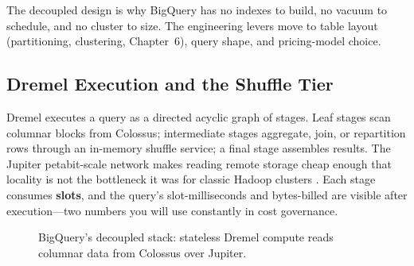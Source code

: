 \begin{notebox}
The decoupled design is why BigQuery has no indexes to build, no vacuum to schedule, and no cluster to size. The engineering levers move to table layout (partitioning, clustering, Chapter~6), query shape, and pricing-model choice.
\end{notebox}

\subsection{Dremel Execution and the Shuffle Tier}
Dremel executes a query as a directed acyclic graph of stages. Leaf stages scan columnar blocks from Colossus; intermediate stages aggregate, join, or repartition rows through an in-memory shuffle service; a final stage assembles results. The Jupiter petabit-scale network makes reading remote storage cheap enough that locality is not the bottleneck it was for classic Hadoop clusters \cite{melnik2010dremel}. Each stage consumes \textbf{slots}, and the query's slot-milliseconds and bytes-billed are visible after execution---two numbers you will use constantly in cost governance.

\begin{figure}[H]
    \centering
    \caption{BigQuery's decoupled stack: stateless Dremel compute reads columnar data from Colossus over Jupiter.}
    \label{fig:ch5-decoupled-architecture}
\end{figure}

